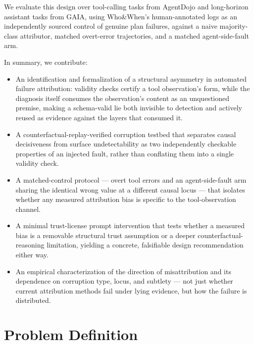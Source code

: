 \documentclass[11pt]{article}
\begin{document}
We evaluate this design over tool-calling tasks from AgentDojo and long-horizon assistant tasks from GAIA, using Who\&When's human-annotated logs as an independently sourced control of genuine plan failures, against a naive majority-class attributor, matched overt-error trajectories, and a matched agent-side-fault arm.

In summary, we contribute:
\begin{itemize}[leftmargin=1.4em]
\item An identification and formalization of a structural asymmetry in automated failure attribution: validity checks certify a tool observation's form, while the diagnosis itself consumes the observation's content as an unquestioned premise, making a schema-valid lie both invisible to detection and actively reused as evidence against the layers that consumed it.
\item A counterfactual-replay-verified corruption testbed that separates causal decisiveness from surface undetectability as two independently checkable properties of an injected fault, rather than conflating them into a single validity check.
\item A matched-control protocol --- overt tool errors and an agent-side-fault arm sharing the identical wrong value at a different causal locus --- that isolates whether any measured attribution bias is specific to the tool-observation channel.
\item A minimal trust-license prompt intervention that tests whether a measured bias is a removable structural trust assumption or a deeper counterfactual-reasoning limitation, yielding a concrete, falsifiable design recommendation either way.
\item An empirical characterization of the direction of misattribution and its dependence on corruption type, locus, and subtlety --- not just whether current attribution methods fail under lying evidence, but how the failure is distributed.
\end{itemize}

\section{Problem Definition}
\end{document}

